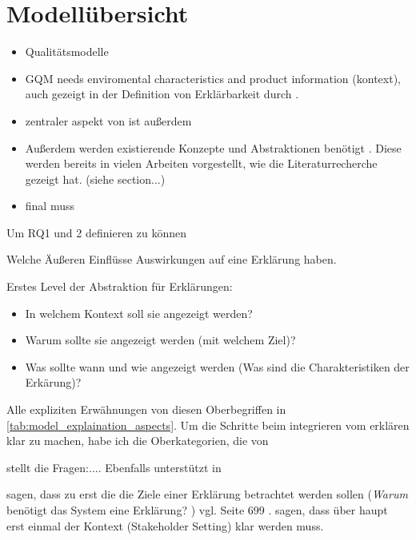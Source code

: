 \section{Modellübersicht}
\label{sec:model_overview}

\begin{itemize}
    \item Qualitätsmodelle \cite{schneider2012abenteuer}
    \item GQM \cite{briand1995goal, schneider2012abenteuer} needs enviromental characteristics and product information (kontext), auch gezeigt in der Definition von Erklärbarkeit durch \cite{chazette_knowledge_nodate}.
    \item zentraler aspekt von \cite{briand1995goal} ist außerdem 
    \item Außerdem werden existierende Konzepte und Abstraktionen benötigt \cite{briand1995goal}. Diese werden bereits in vielen Arbeiten vorgestellt, wie die Literaturrecherche gezeigt hat. (siehe section...)
    \item final muss 
\end{itemize}

Um RQ1 und 2 definieren zu können

Welche Äußeren Einflüsse Auswirkungen auf eine Erklärung haben.

Erstes Level der Abstraktion für Erklärungen:

\begin{itemize}
    \item In welchem Kontext soll sie angezeigt werden? \cite{kohl_explainability_2019, chazette_knowledge_nodate}
    \item Warum sollte sie angezeigt werden (mit welchem Ziel)? \cite{kohl_explainability_2019, rosenfeld_explainability_2019}
    \item Was sollte wann und wie angezeigt werden (Was sind die Charakteristiken der Erkärung)? \cite{kohl_explainability_2019, rosenfeld_explainability_2019}
\end{itemize}

Alle expliziten Erwähnungen von diesen Oberbegriffen in \autoref{tab:model_explaination_aspects}. Um die Schritte beim integrieren vom erklären klar zu machen, habe ich die Oberkategorien, die von 

\cite{rosenfeld_explainability_2019} stellt die Fragen:.... Ebenfalls unterstützt in \cite{chazette2020explainability}

\cite{rosenfeld_explainability_2019} sagen, dass zu erst die die Ziele einer Erklärung betrachtet werden sollen (\glqq \textit{Warum} benötigt das System eine Erklärung? \grqq{}) vgl. Seite 699 \cite{rosenfeld_explainability_2019}. \cite{cirqueira_scenario-based_2020} sagen, dass über haupt erst einmal der Kontext (\glqq Stakeholder Setting\grqq{}) klar werden muss.

